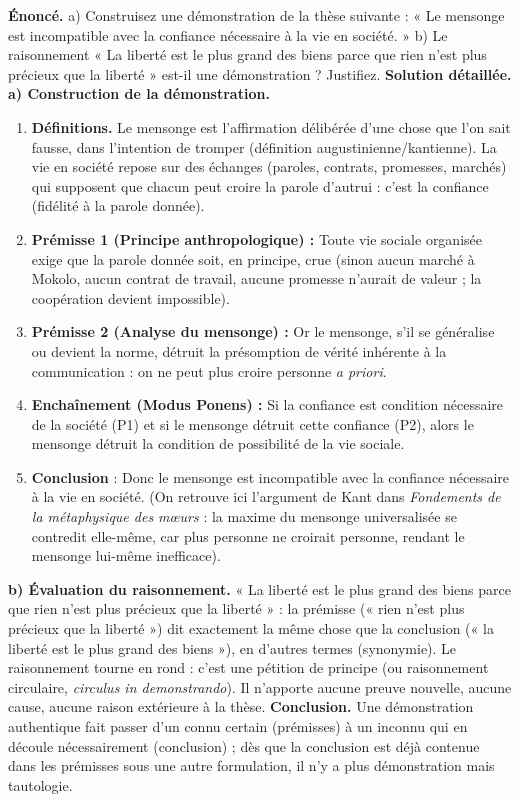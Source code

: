 \documentclass[11pt]{article}
\newcommand{\cle}[1]{{\popxbold\color{popdark}#1}}
\begin{document}
\begin{exoresolu}
\textbf{Énoncé.} a) Construisez une démonstration de la thèse suivante : « Le mensonge est incompatible avec la confiance nécessaire à la vie en société. » b) Le raisonnement « La liberté est le plus grand des biens parce que rien n'est plus précieux que la liberté » est-il une démonstration ? Justifiez.
\tcblower
\textbf{Solution détaillée.}
\textbf{a) Construction de la démonstration.}
\begin{enumerate}
\item \textbf{Définitions.} Le mensonge est l'affirmation délibérée d'une chose que l'on sait fausse, dans l'intention de tromper (définition augustinienne/kantienne). La vie en société repose sur des échanges (paroles, contrats, promesses, marchés) qui supposent que chacun peut croire la parole d'autrui : c'est la \cle{confiance} (fidélité à la parole donnée).
\item \textbf{Prémisse 1 (Principe anthropologique) :} Toute vie sociale organisée exige que la parole donnée soit, en principe, crue (sinon aucun marché à Mokolo, aucun contrat de travail, aucune promesse n'aurait de valeur ; la coopération devient impossible).
\item \textbf{Prémisse 2 (Analyse du mensonge) :} Or le mensonge, s'il se généralise ou devient la norme, détruit la présomption de vérité inhérente à la communication : on ne peut plus croire personne \emph{a priori}.
\item \textbf{Enchaînement (Modus Ponens) :} Si la confiance est condition nécessaire de la société (P1) et si le mensonge détruit cette confiance (P2), alors le mensonge détruit la condition de possibilité de la vie sociale.
\item \textbf{Conclusion} : Donc le mensonge est incompatible avec la confiance nécessaire à la vie en société. (On retrouve ici l'argument de Kant dans \emph{Fondements de la métaphysique des mœurs} : la maxime du mensonge universalisée se contredit elle-même, car plus personne ne croirait personne, rendant le mensonge lui-même inefficace).
\end{enumerate}
\textbf{b) Évaluation du raisonnement.} « La liberté est le plus grand des biens parce que rien n'est plus précieux que la liberté » : la prémisse (« rien n'est plus précieux que la liberté ») dit exactement la même chose que la conclusion (« la liberté est le plus grand des biens »), en d'autres termes (synonymie). Le raisonnement tourne en rond : c'est une \cle{pétition de principe} (ou raisonnement circulaire, \emph{circulus in demonstrando}). Il n'apporte aucune preuve nouvelle, aucune cause, aucune raison extérieure à la thèse.
\textbf{Conclusion.} Une démonstration authentique fait passer d'un connu certain (prémisses) à un inconnu qui en découle nécessairement (conclusion) ; dès que la conclusion est déjà contenue dans les prémisses sous une autre formulation, il n'y a plus démonstration mais tautologie.
\end{exoresolu}
\end{document}
